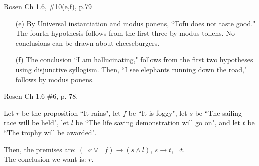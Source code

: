\documentclass[12pt,addpoints]{exam}
\begin{document}
\begin{questions}
\begin{solution}
\begin{itemize}[itemsep=0pt,parsep=0pt,topsep=0pt,partopsep=0pt]
        \end{itemize}
\end{solution}


\question Rosen Ch 1.6, \#10(e,f), p.79 
    \ifprintanswers
        \vspace{-10pt}
    \fi
\begin{solution}
    \begin{itemize}[itemsep=0pt,parsep=0pt,topsep=0pt,partopsep=0pt]
        \item[(e)]  By Universal instantiation and modus ponens, ``Tofu does not taste good." The fourth hypothesis follows from the first three by modus tollens.  No conclusions can be drawn about cheeseburgers.
        \item[(f)] The conclusion ``I am hallucinating," follows from the first two hypotheses using disjunctive syllogism.  Then, ``I see elephants running down the road," follows by modus ponens.
    \end{itemize}
\end{solution}
    

\question[10] Rosen Ch 1.6 \#6, p. 78.
    \ifprintanswers
        \vspace{-10pt}
    \fi
\begin{solution}
Let $r$ be the proposition ``It rains", let $f$ be ``It is foggy",
    let $s$ be ``The sailing race will be held", let $l$ be ``The life
    saving demonstration will go on", and let $t$ be ``The trophy will
    be awarded".

    Then, the premises are: $(\neg r \vee \neg f) \rightarrow (s \wedge l)$, $s \rightarrow t$, $\neg t$. \\
    The conclusion we want is: $r$.


\end{solution}
\end{questions}
\end{document}
